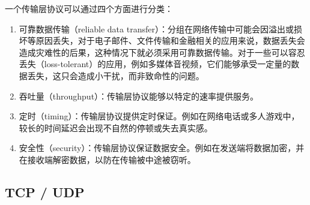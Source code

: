一个传输层协议可以通过四个方面进行分类：

\begin{enumerate}
    \item 可靠数据传输（reliable data transfer）：分组在网络传输中可能会因溢出或损坏等原因丢失，对于电子邮件、文件传输和金融相关的应用来说，数据丢失会造成灾难性的后果，这种情况下就必须采用可靠数据传输。对于一些可以容忍丢失（loss-tolerant）的应用，例如多媒体音视频，它们能够承受一定量的数据丢失，这只会造成小干扰，而非致命性的问题。

    \item 吞吐量（throughput）：传输层协议能够以特定的速率提供服务。

    \item 定时（timing）：传输层协议提供定时保证。例如在网络电话或多人游戏中，较长的时间延迟会出现不自然的停顿或失去真实感。

    \item 安全性（security）：传输层协议保证数据安全。例如在发送端将数据加密，并在接收端解密数据，以防在传输被中途被窃听。
\end{enumerate}

\begin{table}[H]
    \centering
    \caption{常见应用传输服务需求}
\end{table}

\vspace{0.5cm}

\subsection{TCP / UDP}

